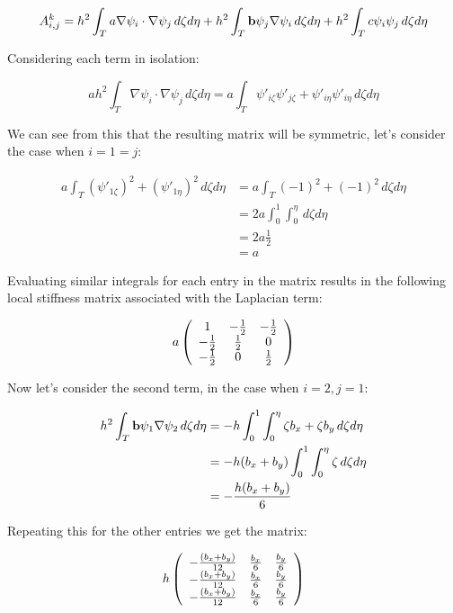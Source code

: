 \[
    A^k_{i,j} = h^2\int_Ta\nabla\psi_i\cdot\nabla\psi_j\,d\zeta d\eta +
                h^2\int_T\mathbf{b}\psi_j\nabla\psi_i\,d\zeta d\eta +
                h^2\int_Tc\psi_i\psi_j\,d\zeta d\eta
\]

Considering each term in isolation:

\[
    ah^2\int_T\nabla\psi_i\cdot\nabla\psi_j\,d\zeta d\eta =
    a\int_T\psi'_{i\zeta}\psi'_{j\zeta} +
        \psi'_{i\eta}\psi'_{i\eta}\,d\zeta d\eta
\]

We can see from this that the resulting matrix will be symmetric, let's
consider the case when $i = 1 = j$:

\begin{align*}
    a\int_T(\psi'_{1\zeta})^2 + (\psi'_{1\eta})^2\,d\zeta d\eta & =
        a\int_T(-1)^2 + (-1)^2\,d\zeta d\eta \\
    &= 2a\int_0^1\int_0^\eta\,d\zeta d\eta \\
    &= 2a\frac{1}{2} \\
    &= a
\end{align*}

Evaluating similar integrals for each entry in the matrix results in the following
local stiffness matrix associated with the Laplacian term:

\begin{equation}\label{eq:stiffness_term_1}
    a\left(\begin{array}{c c c}
        1      & -\frac{1}{2} & -\frac{1}{2} \\
        -\frac{1}{2} & \frac{1}{2}  & 0 \\
        -\frac{1}{2} & 0      & \frac{1}{2}
    \end{array}\right)
\end{equation}

Now let's consider the second term, in the case when $i = 2, j = 1$:

\begin{align*}
    h^2\int_T{\mathbf{b}\psi_1\nabla\psi_2}\, d\zeta d\eta &=
    -h\int_0^1\int_0^\eta{\zeta b_x + \zeta b_y}\, d\zeta d\eta \\
    &= -h(b_x + b_y)\int_0^1\int_0^\eta{\zeta}\, d\zeta d\eta \\
    &= -\frac{h(b_x + b_y)}{6}
\end{align*}

Repeating this for the other entries we get the matrix:

\begin{equation}\label{eq:stiffness_term_2}
    h\left(\begin{array}{c c c}
        -\frac{(b_x + b_y)}{12} & \frac{b_x}{6} & \frac{b_y}{6} \\
        -\frac{(b_x + b_y)}{12} & \frac{b_x}{6} & \frac{b_y}{6} \\
        -\frac{(b_x + b_y)}{12} & \frac{b_x}{6} & \frac{b_y}{6}
    \end{array}\right)
\end{equation}

